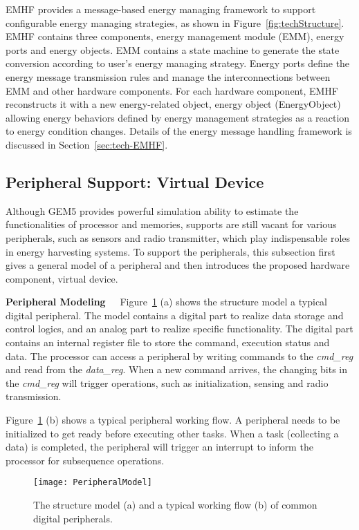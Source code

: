 %
EMHF provides a message-based energy managing framework to support configurable energy managing strategies, as shown in Figure~\ref{fig:techStructure}.
EMHF contains three components, energy management module (EMM), energy ports and energy objects. 
EMM contains a state machine to generate the state conversion according to user's energy managing strategy. 
Energy ports define the energy message transmission rules and manage the interconnections between EMM and other hardware components.
For each hardware component, EMHF reconstructs it with a new energy-related object, energy object (EnergyObject) allowing energy behaviors defined by energy management strategies as a reaction to energy condition changes.
Details of the energy message handling framework is discussed in Section~\ref{sec:tech-EMHF}.


\subsection{Peripheral Support: Virtual Device}	\label{sec:tech-vdev}
%
Although GEM5 provides powerful simulation ability to estimate the functionalities of processor and memories, supports are still vacant for various peripherals, such as sensors and radio transmitter, which play indispensable roles in energy harvesting systems.
To support the peripherals, this subsection first gives a general model of a peripheral and then introduces the proposed hardware component, virtual device.

\textbf{Peripheral Modeling\ \ }
%
Figure~\ref{fig:PeripheralModel} (a) shows the structure model a typical digital peripheral.
The model contains a digital part to realize data storage and control logics, and an analog part to realize specific functionality.
The digital part contains an internal register file to store the command, execution status and data.
The processor can access a peripheral by writing commands to the \emph{cmd\_reg} and read from the \emph{data\_reg}.
When a new command arrives, the changing bits in the \emph{cmd\_reg} will trigger operations, such as initialization, sensing and radio transmission.

Figure~\ref{fig:PeripheralModel} (b) shows a typical peripheral working flow.
A peripheral needs to be initialized to get ready before executing other tasks.
When a task (collecting a data) is completed, the peripheral will trigger an interrupt to inform the processor for subsequence operations.

\begin{figure}[!htpb]
	\centering
	\vspace{-5pt}
	\texttt{[image: PeripheralModel]}
	\vspace{-5pt}
	\caption{The structure model (a) and a typical working flow (b) of common digital peripherals.}	\label{fig:PeripheralModel}
\end{figure}

